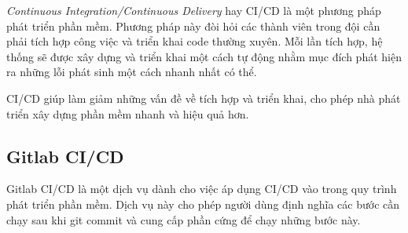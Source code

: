 \documentclass[./../main.tex]{subfiles}
\begin{document}
\emph{Continuous Integration/Continuous Delivery} hay CI/CD là một
phương pháp phát triển phần mềm. Phương pháp này đòi hỏi các thành viên
trong đội cần phải tích hợp công việc và triển khai code thường xuyên.
Mỗi lần tích hợp, hệ thống sẽ được xây dựng và triển khai một cách tự
động nhằm mục đích phát hiện ra những lỗi phát sinh một cách nhanh nhất
có thể.

CI/CD giúp làm giảm những vấn đề về tích hợp và triển khai, cho phép nhà
phát triển xây dựng phần mềm nhanh và hiệu quả hơn.

\hypertarget{gitlab-cicd}{%
\subsection{Gitlab CI/CD}\label{gitlab-cicd}}

Gitlab CI/CD \cite{Git22} là một dịch vụ dành cho việc áp dụng CI/CD vào trong quy
trình phát triển phần mềm. Dịch vụ này cho phép người dùng định nghĩa
các bước cần chạy sau khi git commit và cung cấp phần cứng để chạy những
bước này.
\end{document}
